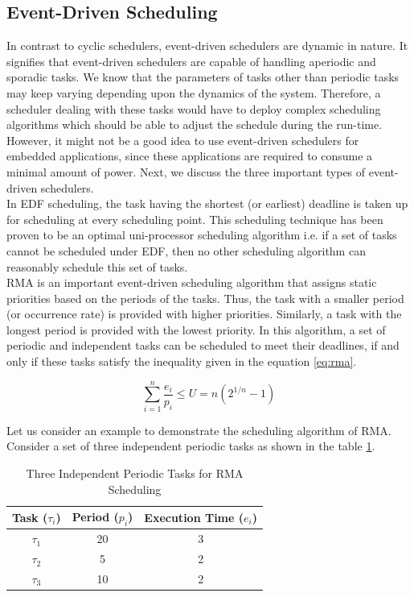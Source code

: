 \documentclass[12pt]{report}
\begin{document}
\subsection{Event-Driven Scheduling}
In contrast to cyclic schedulers, event-driven schedulers are dynamic in nature. It signifies that event-driven schedulers are capable of handling aperiodic and sporadic tasks. We know that the parameters of tasks other than periodic tasks may keep varying depending upon the dynamics of the system. Therefore, a scheduler dealing with these tasks would have to deploy complex scheduling algorithms which should be able to adjust the schedule during the run-time. However, it might not be a good idea to use event-driven schedulers for embedded applications, since these applications are required to consume a minimal amount of power. Next, we discuss the three important types of event-driven schedulers. \\

In EDF scheduling, the task having the shortest (or earliest) deadline is taken up for scheduling at every scheduling point. This scheduling technique has been proven to be an optimal uni-processor scheduling algorithm i.e. if a set of tasks cannot be scheduled under EDF, then no other scheduling algorithm can reasonably schedule this set of tasks.\\ 

RMA is an important event-driven scheduling algorithm that assigns static priorities based on the periods of the tasks. Thus, the task with a smaller period (or occurrence rate) is provided with higher priorities. Similarly, a task with the longest period is provided with the lowest priority. In this algorithm, a set of periodic and independent tasks can be scheduled to meet their deadlines, if and only if these tasks satisfy the inequality given in the equation \ref{eq:rma}.

\begin{equation} \label{eq:rma}
\sum_{i=1}^{n} \frac{e_i}{p_i} \le U = n(2^{1/n} - 1)
\end{equation}

Let us consider an example to demonstrate the scheduling algorithm of RMA. Consider a set of three independent periodic tasks as shown in the table \ref{table:rma-tasks}. 
\begin{table}[h]
\centering
\begin{tabular}{|c|c|c|}
 \hline
 \textbf{Task ($\tau_i$)} &  \textbf{Period ($p_i$)} & \textbf{Execution Time ($e_i$)}\\
 \hline \hline
  $\tau_1$ & 20 & 3 \\ 
 \hline
 $\tau_2$ & 5 & 2 \\
 \hline
 $\tau_3$ & 10 & 2 \\ 
 \hline
\end{tabular}
\caption{Three Independent Periodic Tasks for RMA Scheduling}
\label{table:rma-tasks}
\end{table} 
\end{document}
